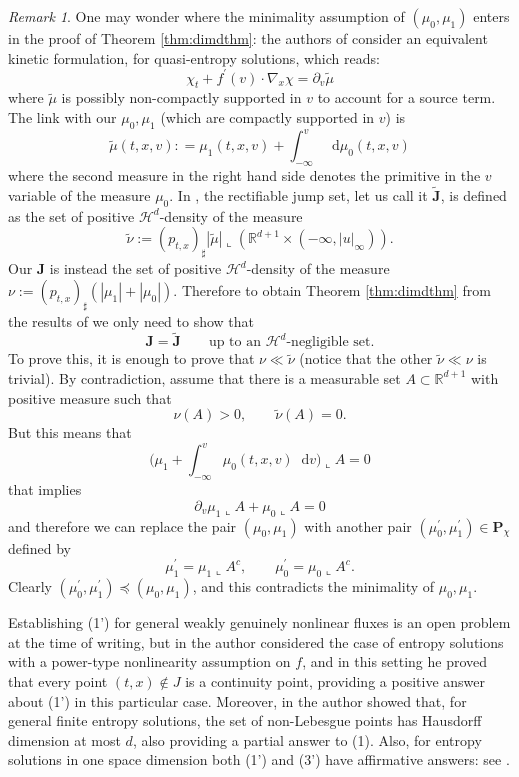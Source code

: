 \documentclass[11pt, twoside, reqno]{amsart}
\theoremstyle{definition}
\theoremstyle{remark}
\newtheorem{remark}[thm]{Remark}
\numberwithin{equation}{section}
\newcommand*\dif{\mathop{}\!\mathrm{d}}
\newcommand{\wt}[1]{\widetilde{#1}}
\begin{document}
\begin{remark}
    One may wonder where the minimality assumption of $(\mu_0, \mu_1)$ enters in the proof of Theorem \ref{thm:dimdthm}: the authors of \cite{DOW03} consider an equivalent kinetic formulation, for quasi-entropy solutions, which reads:
    \begin{equation}
        \chi_t + f^\prime(v)\cdot \nabla_x \chi = \partial_v \wt \mu
    \end{equation}
    where $\wt \mu$ is possibly non-compactly supported in $v$ to account for a source term. The link with our $\mu_0, \mu_1$ (which are compactly supported in $v$) is 
    $$
    \wt \mu(t,x,v): = \mu_1(t,x,v) + \int_{-\infty}^v \dif \mu_0(t,x, v)
    $$
    where the second measure in the right hand side  denotes the primitive in the $v$ variable of the measure $\mu_0$.
 In \cite{DOW03}, the rectifiable jump set, let us call it $\wt {\mathbf J}$, is defined as the set of positive $\mathscr H^d$-density of the measure $$\wt \nu := (p_{t,x})_\sharp |\wt \mu| \llcorner (\mathbb R^{d+1} \times(-\infty, |u|_\infty)).$$ Our $\mathbf J$ is instead the set of positive $\mathscr H^d$-density of the measure $\nu:=(p_{t,x})_\sharp(|\mu_1| +|\mu_0|)$. Therefore to obtain Theorem \ref{thm:dimdthm} from the results of \cite{DOW03} we only need to show that 
 $$
 \mathbf J =  \wt{\mathbf J}  \qquad \text{up to an $\mathscr H^d$-negligible set}.
 $$
To prove this, it is enough to prove that $\nu \ll \wt \nu$ (notice that the other $\wt \nu \ll \nu$ is trivial). By contradiction, assume that there is a measurable set $A \subset \mathbb R^{d+1}$ with positive measure such that 
$$
\nu(A) > 0, \qquad \wt \nu(A) = 0.
$$
But this means that $$\Big( \mu_1 + \int_{-\infty}^v \mu_0(t,x,v) \dif v\Big)\llcorner A = 0$$ that implies $$ \partial_v \mu_1\llcorner A + \mu_0\llcorner A = 0$$ and therefore we can replace the pair $(\mu_0, \mu_1)$ with another pair $(\mu_0^\prime, \mu_1^\prime) \in \mathbf P_\chi$ defined by
$$
\mu_1^\prime = \mu_1 \llcorner A^c, \qquad \mu_0^\prime = \mu_0 \llcorner A^c.
$$
Clearly $(\mu_0^\prime, \mu_1^\prime) \preceq (\mu_0, \mu_1)$, and this contradicts the minimality of $\mu_0, \mu_1$.
\end{remark}


Establishing (1') for general weakly genuinely nonlinear fluxes is an open problem at the time of writing, but in  \cite{Si18} the author considered the case of entropy solutions  with a power-type nonlinearity assumption on $f$, and in this setting he proved that every point $(t,x)\notin J$ is a continuity point, providing a 
positive answer about (1') in this particular case. Moreover, in \cite{marconi_structure} the author showed that, for general finite entropy solutions, the set of non-Lebesgue points has Hausdorff dimension at most $d$, also providing a partial answer to (1). Also, for entropy solutions in one space dimension both (1') and (3') have affirmative answers: see \cite{BM_structure}.
\end{document}
